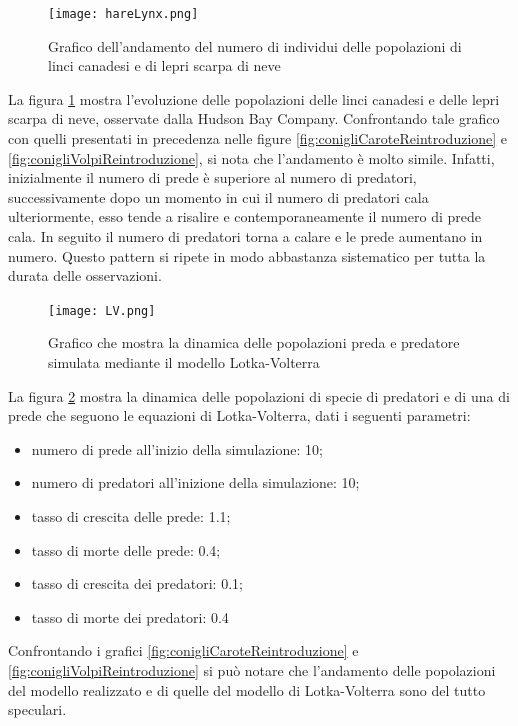 \documentclass[11pt]{article}
\begin{document}
\begin{figure}[h!]
     \centering
     \texttt{[image: hareLynx.png]}
     \caption{Grafico dell'andamento del numero di individui delle popolazioni di linci canadesi e di lepri scarpa di neve}
     \label{fig:hareLynx}
\end{figure}

La figura \ref{fig:hareLynx} mostra l'evoluzione delle popolazioni delle linci canadesi e delle lepri scarpa di neve, osservate dalla Hudson Bay Company. Confrontando tale grafico con quelli presentati in precedenza nelle figure \ref{fig:conigliCaroteReintroduzione} e \ref{fig:conigliVolpiReintroduzione}, si nota che l'andamento è molto simile. Infatti, inizialmente il numero di prede è superiore al numero di predatori, successivamente dopo un momento in cui il numero di predatori cala ulteriormente, esso  tende a risalire e contemporaneamente il numero di prede cala. In seguito il numero di predatori torna a calare e le prede aumentano in numero. Questo pattern si ripete in modo abbastanza sistematico per tutta la durata delle osservazioni. 

\begin{figure}[h!]
     \centering
     \texttt{[image: LV.png]}
     \caption{Grafico che mostra la dinamica delle popolazioni preda e predatore simulata mediante il modello Lotka-Volterra}
     \label{fig:LVValidazione}
\end{figure}

La figura \ref{fig:LVValidazione} mostra la dinamica delle popolazioni di specie di predatori e di una di prede che seguono le equazioni di Lotka-Volterra, dati i seguenti parametri: 
\begin{itemize}
	\item numero di prede all'inizio della simulazione: 10;
	\item numero di predatori all'inizione della simulazione: 10;
	\item tasso di crescita delle prede: 1.1;
	\item tasso di morte delle prede: 0.4;
	\item tasso di crescita dei predatori: 0.1;
	\item tasso di morte dei predatori: 0.4
\end{itemize}
Confrontando i grafici \ref{fig:conigliCaroteReintroduzione} e \ref{fig:conigliVolpiReintroduzione} si può notare che l'andamento delle popolazioni del modello realizzato e di quelle del modello di Lotka-Volterra sono del tutto speculari. 
\end{document}
